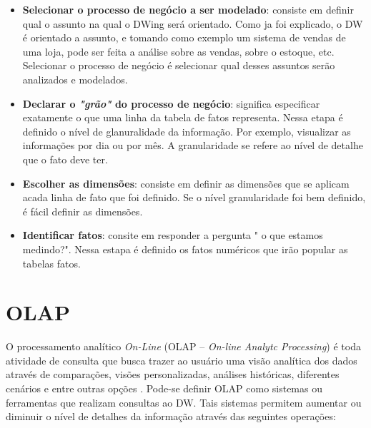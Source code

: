 
 \begin{itemize}
 	\item \textbf{Selecionar o processo de negócio a ser modelado}: consiste em definir qual o assunto na qual o DWing será orientado. Como ja foi explicado, o DW é orientado a assunto, e tomando como exemplo um sistema de vendas de uma loja, pode ser feita a análise sobre as vendas, sobre o estoque, etc. Selecionar o processo de negócio é selecionar qual desses assuntos serão analizados e modelados.
 	\item \textbf{Declarar o \emph{"grão"} do processo de negócio}: significa especificar exatamente o que uma linha da tabela de fatos representa. Nessa etapa é definido o nível de glanuralidade da informação. Por exemplo, visualizar as informações por dia ou por mês. A granularidade se refere ao nível de detalhe que o fato deve ter. 
 	\item \textbf{Escolher as dimensões}: consiste em definir as dimensões que se aplicam acada linha de fato que foi definido. Se o nível granularidade foi bem definido, é fácil definir as dimensões. 
 	\item \textbf{Identificar fatos}: consite em responder a pergunta "	o que estamos medindo?". Nessa estapa é definido os fatos numéricos que irão popular as tabelas fatos.	  
 \end{itemize}

\section{OLAP}
\label{sec-olap}

%

O processamento analítico \emph{On-Line} (OLAP – \emph{On-line Analytc Processing}) é toda atividade de consulta que busca trazer ao usuário uma visão analítica dos dados através de comparações, visões personalizadas, análises históricas, diferentes cenários e entre outras opções \cite{kimball2002}. Pode-se definir OLAP como sistemas ou ferramentas que realizam consultas ao DW. Tais sistemas permitem aumentar ou diminuir o nível de detalhes da informação através das seguintes operações:

%

